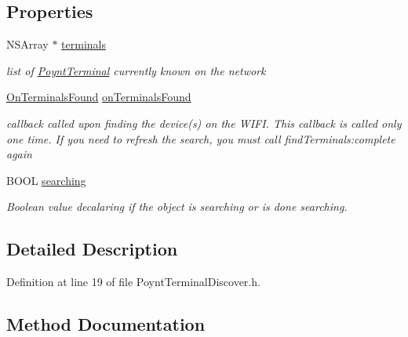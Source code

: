 \subsection*{Properties}
\begin{DoxyCompactItemize}
\item 
N\+S\+Array $\ast$ \hyperlink{interface_poynt_terminal_discover_a5388c2786127d007a5b553986779ee46}{terminals}
\begin{DoxyCompactList}\small\item\em list of \hyperlink{interface_poynt_terminal}{Poynt\+Terminal} currently known on the network \end{DoxyCompactList}\item 
\hyperlink{_poynt_terminal_discover_8h_a45c48a836064cd340f281fa5ef2edef5}{On\+Terminals\+Found} \hyperlink{interface_poynt_terminal_discover_a2108a121006de9953dbf24fa265db472}{on\+Terminals\+Found}
\begin{DoxyCompactList}\small\item\em callback called upon finding the device(s) on the W\+I\+FI.  This callback is called only one time. If you need to refresh the search, you must call find\+Terminals\+:complete again \end{DoxyCompactList}\item 
B\+O\+OL \hyperlink{interface_poynt_terminal_discover_a3ec4dc196847dee68ad6c99d08bfef95}{searching}
\begin{DoxyCompactList}\small\item\em Boolean value decalaring if the object is searching or is done searching. \end{DoxyCompactList}\end{DoxyCompactItemize}


\subsection{Detailed Description}


Definition at line 19 of file Poynt\+Terminal\+Discover.\+h.



\subsection{Method Documentation}
\hypertarget{interface_poynt_terminal_discover_aab8fdef29321b4bf9ff4ba57e1593e9a}{}\label{interface_poynt_terminal_discover_aab8fdef29321b4bf9ff4ba57e1593e9a} 
